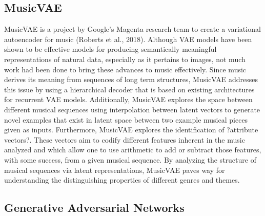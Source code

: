 \documentclass{article}
\begin{document}
\subsection{MusicVAE}

MusicVAE is a project by Google's Magenta research team to create a variational autoencoder for music (Roberts et al., 2018). Although VAE models have been shown to be effective models for producing semantically meaningful representations of natural data, especially as it pertains to images, not much work had been done to bring these advances to music effectively. Since music derives its meaning from sequences of long term structures, MusicVAE addresses this issue by using a hierarchical decoder that is based on existing architectures for recurrent VAE models. Additionally, MusicVAE explores the space between different musical sequences using interpolation between latent vectors to generate novel examples that exist in latent space between two example musical pieces given as inputs. Furthermore, MusicVAE explores the identification of ?attribute vectors?. These vectors aim to codify different features inherent in the music analyzed and which allow one to use arithmetic to add or subtract those features, with some success, from a given musical sequence. By analyzing the structure of musical sequences via latent representations, MusicVAE paves way for understanding the distinguishing properties of different genres and themes.

\subsection{Generative Adversarial Networks}
\end{document}
